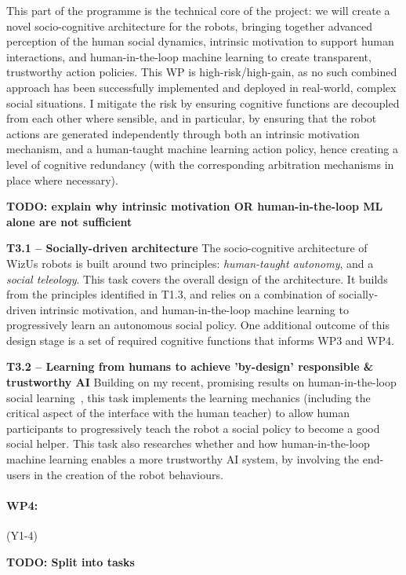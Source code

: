 \documentclass[11pt,a4paper]{report}
\newcommand{\project}{WizUs\xspace}
\newcommand{\TODO}[1]{{\color{red}\textbf{TODO: #1}}}
\begin{document}
This part of the programme is the technical core of the project: we will create a
novel socio-cognitive architecture for the robots, bringing together advanced
perception of the human social dynamics, intrinsic motivation to support human
interactions, and human-in-the-loop machine learning to create transparent,
trustworthy action policies. This WP is high-risk/high-gain, as no such combined
approach has been successfully implemented and deployed in real-world, complex
social situations. I mitigate the risk by ensuring cognitive functions are
decoupled from each other where sensible, and in particular, by ensuring that
the robot actions are generated independently through both an intrinsic
motivation mechanism, and a human-taught machine learning action policy, hence
creating a level of cognitive redundancy (with the corresponding arbitration
mechanisms in place where necessary).

\TODO{explain why intrinsic motivation OR human-in-the-loop ML alone are not
sufficient}

\textbf{T3.1 -- Socially-driven architecture} The socio-cognitive architecture
of \project robots is built around two principles: \emph{human-taught autonomy},
and a \emph{social teleology}. This task covers the overall design of the
architecture. It builds from the principles identified in T1.3, and relies on a
combination of socially-driven intrinsic motivation, and human-in-the-loop
machine learning to progressively learn an autonomous social policy.  One
additional outcome of this design stage is a set of required cognitive functions that
informs WP3 and WP4.

\textbf{T3.2 -- Learning from humans to achieve 'by-design' responsible \&
trustworthy AI} Building on my recent, promising results on human-in-the-loop
social learning~\cite{senft2017supervised,senft2019teaching}, this task
implements the learning mechanics (including the critical aspect of the
interface with the human teacher) to allow human participants to progressively
teach the robot a social policy to become a good social helper. This task also
researches whether and how human-in-the-loop machine learning enables a more
trustworthy AI system, by involving the end-users in the creation of the robot
behaviours.


\paragraph{WP4: \textbf{\wpFour}} (Y1-4)

\TODO{Split into tasks}
\end{document}
